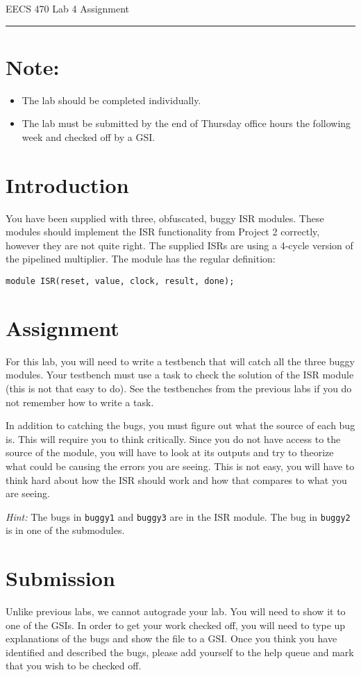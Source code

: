\documentclass{article}
\newcommand{\shortbar}{
	\vspace*{-12pt}
	\begin{center}
		\rule{5ex}{0.1pt}
	\end{center}
}
\newcommand{\lab}[1]{
	\begin{center}
		\LARGE{
			\vspace*{-32pt}
			EECS 470 Lab #1 Assignment
			\shortbar
			\vspace*{-20pt}
		}
	\end{center}
}
\begin{document}
\lab{4}

\section*{Note:}
\begin{itemize}
	\item The lab should be completed individually.
	\item The lab must be submitted by the end of Thursday office hours the
		following week and checked off by a GSI.
\end{itemize}

\section{Introduction}
You have been supplied with three, obfuscated, buggy ISR modules. These modules
should implement the ISR functionality from Project 2 correctly, however they 
are not quite right. The supplied ISRs are using a 4-cycle version of the 
pipelined multiplier. The module has the regular definition: 

\texttt{module ISR(reset, value, clock, result, done);}

\section{Assignment}
For this lab, you will need to write a testbench that will catch all the three
buggy modules. Your testbench must use a task to check the solution of the ISR
module (this is not that easy to do). See the testbenches from the previous labs
if you do not remember how to write a task.

In addition to catching the bugs, you must figure out what the source of each 
bug is. This will require you to think critically. Since you do not have access 
to the source of the module, you will have to look at its outputs and try to 
theorize what could be causing the errors you are seeing. This is not easy, you 
will have to think hard about how the ISR should work and how that compares to 
what you are seeing.

\emph{Hint:} The bugs in \texttt{buggy1} and \texttt{buggy3} are in the ISR 
module. The bug in \texttt{buggy2} is in one of the submodules.


\section{Submission}
Unlike previous labs, we cannot autograde your lab. You will need to show it to
one of the GSIs. In order to get your work checked off, you will need to type up 
explanations of the bugs and show the file to a GSI. Once you think you have 
identified and described the bugs, please add yourself to the help queue and 
mark that you wish to be checked off.
\end{document}
